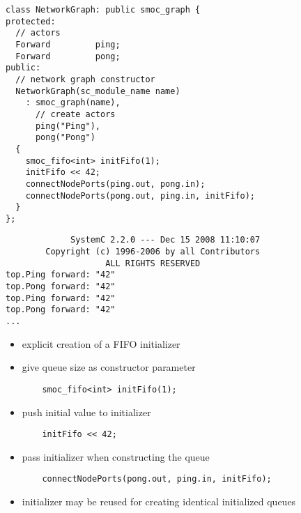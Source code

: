 \begin{frame}[fragile=singleslide]
\begin{lstlisting}
class NetworkGraph: public smoc_graph {
protected:
  // actors
  Forward         ping;
  Forward         pong;
public:
  // network graph constructor
  NetworkGraph(sc_module_name name)
    : smoc_graph(name),
      // create actors
      ping("Ping"),
      pong("Pong")
  {
    smoc_fifo<int> initFifo(1);
    initFifo << 42;
    connectNodePorts(ping.out, pong.in);
    connectNodePorts(pong.out, ping.in, initFifo);
  }
};
\end{lstlisting}
\end{frame}





\begin{frame}[fragile=singleslide]
\begin{lstlisting}
             SystemC 2.2.0 --- Dec 15 2008 11:10:07
        Copyright (c) 1996-2006 by all Contributors
                    ALL RIGHTS RESERVED
top.Ping forward: "42"
top.Pong forward: "42"
top.Ping forward: "42"
top.Pong forward: "42"
...
\end{lstlisting}
\end{frame}

\begin{frame}[fragile=singleslide]
\begin{itemize}
\item explicit creation of a FIFO initializer %
\item give queue size as constructor parameter
\begin{lstlisting}
    smoc_fifo<int> initFifo(1);
\end{lstlisting}
\item push initial value to initializer
\begin{lstlisting}
    initFifo << 42;
\end{lstlisting}
\item pass initializer when constructing the queue
\begin{lstlisting}
    connectNodePorts(pong.out, ping.in, initFifo);
\end{lstlisting}
\item initializer may be reused for creating identical initialized queues
\end{itemize}
\end{frame}


